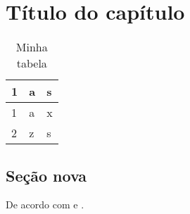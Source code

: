 \documentclass[12pt]{report}
\begin{document}
\chapter{Título do capítulo}
\lipsum[2-4] \lipsum[1]
\begin{table}[]
\centering
\caption{Minha tabela}
\label{my-label}
\begin{tabular}{lll}
1 & a & s \\ \hline
1 & a & x \\
2 & z & s
\end{tabular}
\end{table}
\section{Seção nova}
\lipsum[2-3]
De acordo com \cite{Rodrigues2016} e \cite{kopka2004guide}.





\end{document}
